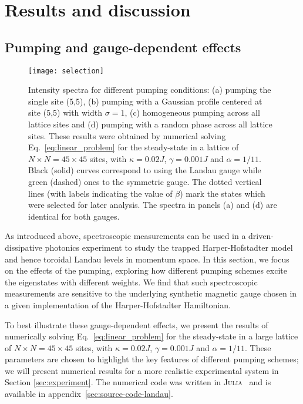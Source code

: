 \section{Results and discussion}
\label{sec:results}

\subsection{Pumping and gauge-dependent effects}
\label{sec:selection}

\begin{figure}[tb]\centering
  \texttt{[image: selection]}
  \caption{Intensity spectra for different pumping conditions: (a)
pumping the single site (5,5), (b) pumping with a Gaussian profile
centered at site (5,5) with width $\sigma=1$, (c) homogeneous pumping
across all lattice sites and (d) pumping with a random phase across
all lattice sites. These results were obtained by numerical solving
Eq.~\eqref{eq:linear_problem} for the steady-state in a lattice of $N
\times N = 45 \times 45$ sites, with $\kappa = 0.02 J$, $\gamma =
0.001 J$ and $\alpha = 1/11$.  Black (solid) curves correspond to
using the Landau gauge while green (dashed) ones to the symmetric
gauge. The dotted vertical lines (with labels indicating the value of
$\beta$) mark the states which were selected for later analysis. The
spectra in panels (a) and (d) are identical for both gauges.}
  \label{fig:pumping_schemes}
\end{figure}

As introduced above, spectroscopic measurements can be used in a
driven-dissipative photonics experiment to study the trapped
Harper-Hofstadter model and hence toroidal Landau levels in momentum
space. In this section, we focus on the effects of the pumping,
exploring how different pumping schemes excite the eigenstates with
different weights. We find that such spectroscopic measurements are
sensitive to the underlying synthetic magnetic gauge chosen in a given
implementation of the Harper-Hofstadter Hamiltonian.

To best illustrate these gauge-dependent effects, we present the
results of numerically solving Eq.~\eqref{eq:linear_problem} for the
steady-state in a large lattice of $N \times N = 45 \times 45$ sites,
with $\kappa = 0.02 J$, $\gamma = 0.001 J$ and $\alpha = 1/11$.  These
parameters are chosen to highlight the key features of different
pumping schemes; we will present numerical results for a more
realistic experimental system in Section \ref{sec:experiment}.  The
numerical code was written in \textsc{Julia}~\cite{bezanson2014julia}
and is available in appendix~\ref{sec:source-code-landau}.

